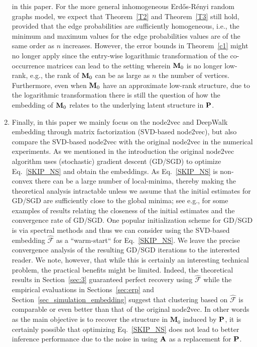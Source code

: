 \documentclass[10pt,journal,compsoc]{IEEEtran}
\newcommand{\bds}{\boldsymbol}
\newcommand{\M}[1]{{{\mathbf{\MakeUppercase{#1}}}}}
\numberwithin{equation}{section}
\begin{document}
\begin{enumerate}
    in this paper. For the more general inhomogeneous Erd\H{o}s-R\'{e}nyi random graphs
model, we expect that Theorem~\ref{T2} and Theorem~\ref{T3} 
still
    hold, provided that the edge probabilities are sufficiently
homogeneous, i.e., the minimum and maximum values for the edge
probabilities values are of the same order as $n$
increases. However, the error bounds in Theorem~\ref{c1} 
    might no longer apply since %
    the entry-wise logarithmic transformation of the co-occurrence matrices can lead
    to the setting wherein $\M M_0$ is no longer low-rank, e.g., the rank of $\M M_0$ can be as large as $n$ the number of vertices. Furthermore, even when $\M M_0$ have an approximate low-rank structure, due to the logarithmic transformation there is still the question of how the embedding of $\M M_0$ relates to the underlying latent structure in $\M P$.
%    

  \item Finally, in this paper we mainly focus on the node2vec and DeepWalk embedding through
 matrix factorization (SVD-based node2vec), but also compare the SVD-based node2vec with the original node2vec in the numerical experiments. As we mentioned in the introduction the original node2vec algorithm
 uses (stochastic) gradient descent (GD/SGD) to optimize Eq.~\eqref{SKIP_NS}
 and obtain the embeddings. As Eq.~\eqref{SKIP_NS} is non-convex there can be a large number of
 local-minima, thereby making the theoretical analysis intractable unless we assume that the initial estimates for GD/SGD are sufficiently close to the global minima; see
 e.g., \cite{chi2019nonconvex,sgd_convergence} for some examples of results relating the closeness of the initial estimates and the convergence rate of GD/SGD. One popular initialization scheme for GD/SGD is via spectral methods and thus we can consider using the SVD-based embedding $\hat{\bds{\mathcal{F}}}$ as a ``warm-start`` for Eq.~\eqref{SKIP_NS}. We leave the precise convergence analysis of the resulting GD/SGD iterations to the interested reader. We note, however, that while this is certainly an interesting technical problem, the practical benefits might be limited. Indeed, the theoretical results in Section~\ref{sec:3} guaranteed perfect recovery using $\hat{\bds{\mathcal{F}}}$ while the empirical evaluations in Sections~\ref{sec:erp} and Section~\ref{sec_simulation_embedding} suggest that clustering based on $\hat{\bds{\mathcal{F}}}$ is comparable or even better than that of the original node2vec. In other words as the main objective is to recover the structure in $\mathbf{M}_0$ induced by $\M P$, it is certainly possible that optimizing Eq.~\eqref{SKIP_NS} does not lead to better inference performance due to the noise in using $\M A$ as a replacement for $\M P$. 
 \end{enumerate}
\end{document}
